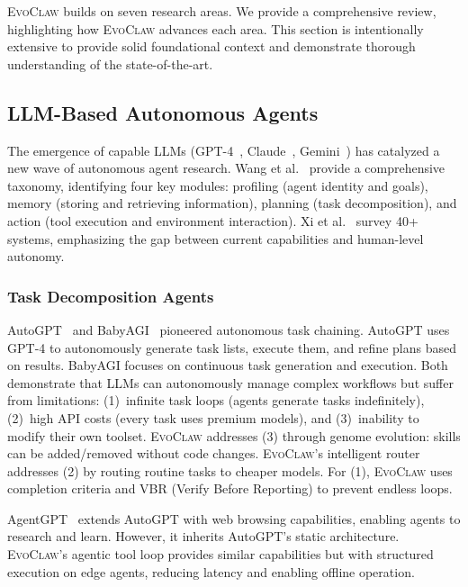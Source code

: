 \documentclass{article}
\newcommand{\evoclaw}{\textsc{EvoClaw}}
\begin{document}
\evoclaw{} builds on seven research areas. We provide a comprehensive review, highlighting how \evoclaw{} advances each area. This section is intentionally extensive to provide solid foundational context and demonstrate thorough understanding of the state-of-the-art.

\subsection{LLM-Based Autonomous Agents}

The emergence of capable LLMs (GPT-4~\cite{openai2023gpt4}, Claude~\cite{anthropic2023claude}, Gemini~\cite{google2023gemini}) has catalyzed a new wave of autonomous agent research. Wang et al.~\cite{wang2023survey} provide a comprehensive taxonomy, identifying four key modules: profiling (agent identity and goals), memory (storing and retrieving information), planning (task decomposition), and action (tool execution and environment interaction). Xi et al.~\cite{xi2023rise} survey 40+ systems, emphasizing the gap between current capabilities and human-level autonomy.

\subsubsection{Task Decomposition Agents}

AutoGPT~\cite{auto_gpt} and BabyAGI~\cite{babyagi} pioneered autonomous task chaining. AutoGPT uses GPT-4 to autonomously generate task lists, execute them, and refine plans based on results. BabyAGI focuses on continuous task generation and execution. Both demonstrate that LLMs can autonomously manage complex workflows but suffer from limitations: (1)~infinite task loops (agents generate tasks indefinitely), (2)~high API costs (every task uses premium models), and (3)~inability to modify their own toolset. \evoclaw{} addresses (3) through genome evolution: skills can be added/removed without code changes. \evoclaw{}'s intelligent router addresses (2) by routing routine tasks to cheaper models. For (1), \evoclaw{} uses completion criteria and VBR (Verify Before Reporting) to prevent endless loops.

AgentGPT~\cite{agent_gpt} extends AutoGPT with web browsing capabilities, enabling agents to research and learn. However, it inherits AutoGPT's static architecture. \evoclaw{}'s agentic tool loop provides similar capabilities but with structured execution on edge agents, reducing latency and enabling offline operation.
\end{document}
